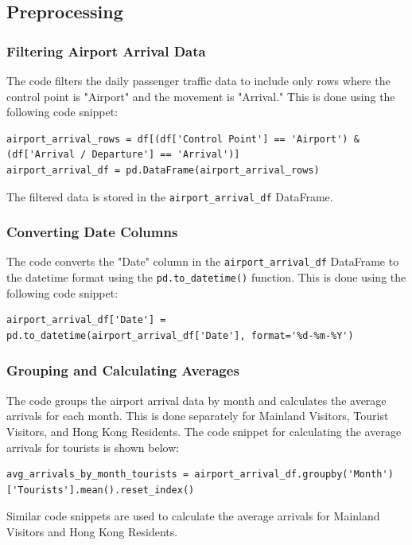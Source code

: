 \documentclass{article}
\begin{document}
\subsection{Preprocessing}
\subsubsection{Filtering Airport Arrival Data}
The code filters the daily passenger traffic data to include only rows where the control point is "Airport" and the movement is "Arrival." This is done using the following code snippet:

\begin{lstlisting}
airport_arrival_rows = df[(df['Control Point'] == 'Airport') & (df['Arrival / Departure'] == 'Arrival')]
airport_arrival_df = pd.DataFrame(airport_arrival_rows)
\end{lstlisting}

The filtered data is stored in the \texttt{airport\_arrival\_df} DataFrame.

\subsubsection{Converting Date Columns}
The code converts the "Date" column in the \texttt{airport\_arrival\_df} DataFrame to the datetime format using the \texttt{pd.to\_datetime()} function. This is done using the following code snippet:

\begin{lstlisting}
airport_arrival_df['Date'] = pd.to_datetime(airport_arrival_df['Date'], format='%d-%m-%Y')
\end{lstlisting}

\subsubsection{Grouping and Calculating Averages}
The code groups the airport arrival data by month and calculates the average arrivals for each month. This is done separately for Mainland Visitors, Tourist Visitors, and Hong Kong Residents. The code snippet for calculating the average arrivals for tourists is shown below:

\begin{lstlisting}
avg_arrivals_by_month_tourists = airport_arrival_df.groupby('Month')['Tourists'].mean().reset_index()
\end{lstlisting}

Similar code snippets are used to calculate the average arrivals for Mainland Visitors and Hong Kong Residents.
\end{document}
